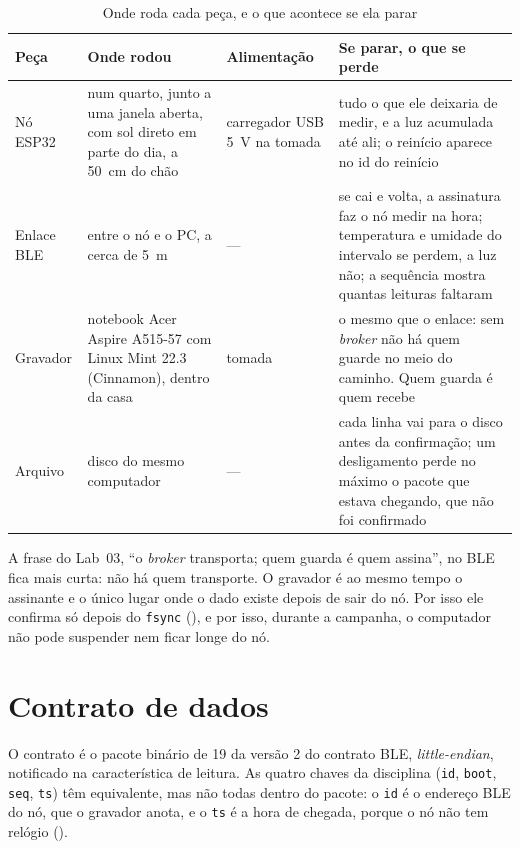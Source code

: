\begin{table}[H]
\centering
\caption{Onde roda cada peça, e o que acontece se ela parar}
\label{tab:pecas}
\footnotesize
\begin{tabular}{@{}L{2.2cm}L{3.4cm}L{2.6cm}L{5.8cm}@{}}
\toprule
\textbf{Peça} & \textbf{Onde rodou} & \textbf{Alimentação} & \textbf{Se parar, o que se perde} \\
\midrule
Nó ESP32 & num quarto, junto a uma janela aberta, com sol direto em parte do dia, a \SI{50}{\centi\metre} do chão & carregador USB \SI{5}{\volt} na tomada &
  tudo o que ele deixaria de medir, e a luz acumulada até ali; o reinício
  aparece no id do reinício \\
Enlace BLE & entre o nó e o PC, a cerca de \SI{5}{\metre} & --- &
  se cai e volta, a assinatura faz o nó medir na hora; temperatura e
  umidade do intervalo se perdem, a luz não; a sequência mostra quantas
  leituras faltaram \\
Gravador & notebook Acer Aspire A515-57 com Linux Mint 22.3 (Cinnamon), dentro da casa & tomada &
  o mesmo que o enlace: sem \emph{broker} não há quem guarde no meio do
  caminho. Quem guarda é quem recebe \\
Arquivo & disco do mesmo computador & --- &
  cada linha vai para o disco antes da confirmação; um desligamento
  perde no máximo o pacote que estava chegando, que não foi confirmado \\
\bottomrule
\end{tabular}
\end{table}

A frase do Lab~03, \enquote{o \emph{broker} transporta; quem guarda é
quem assina}, no BLE fica mais curta: não há quem transporte. O gravador
é ao mesmo tempo o assinante e o único lugar onde o dado existe depois de
sair do nó. Por isso ele confirma só depois do \texttt{fsync}
(), e por isso, durante a campanha, o computador não pode suspender
nem ficar longe do nó.

\section{Contrato de dados}
\label{sec:contrato-dados}
\rubricaJustificativa

O contrato é o pacote binário de \SI{19}{\byte} da versão 2 do contrato
BLE, \emph{little-endian}, notificado na característica de leitura. As
quatro chaves da disciplina (\texttt{id}, \texttt{boot}, \texttt{seq},
\texttt{ts}) têm equivalente, mas não todas dentro do pacote: o
\texttt{id} é o endereço BLE do nó, que o gravador anota, e o
\texttt{ts} é a hora de chegada, porque o nó não tem relógio ().

